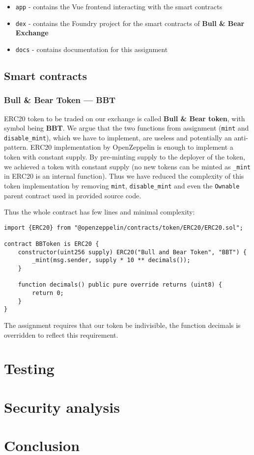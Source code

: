 \documentclass[11pt,a4paper]{article}
\begin{document}
\begin{itemize}
    \item \texttt{app} - contains the Vue frontend interacting with the smart contracts
    \item \texttt{dex} - contains the Foundry project for the smart contracts of \textbf{Bull \& Bear Exchange}
    \item \texttt{docs} - contains documentation for this assignment
\end{itemize}

\subsection*{Smart contracts}

\subsubsection*{Bull \& Bear Token --- BBT}

ERC20 token to be traded on our exchange is called \textbf{Bull \& Bear token},
with symbol being \textbf{BBT}. We argue that the two functions from assignment
(\texttt{mint} and \texttt{disable\_mint}), which we have to implement, are
useless and potentially an anti-pattern. ERC20 implementation by
OpenZeppelin is enough to implement a token with constant supply.
By pre-minting supply to the deployer of the token, we achieved a token
with constant supply (no new tokens can be minted as \texttt{\_mint} in ERC20
is an internal function\cite{openzeppelinERC20}). Thus we have reduced the
complexity of this token implementation by removing \texttt{mint}, \texttt{disable\_mint}
and even the \texttt{Ownable} parent contract used in provided source code.

Thus the whole contract has few lines and minimal complexity:

\begin{verbatim}
import {ERC20} from "@openzeppelin/contracts/token/ERC20/ERC20.sol";

contract BBToken is ERC20 {
    constructor(uint256 supply) ERC20("Bull and Bear Token", "BBT") {
        _mint(msg.sender, supply * 10 ** decimals());
    }

    function decimals() public pure override returns (uint8) {
        return 0;
    }
}
\end{verbatim}

The assignment requires that our token be indivisible, the function
decimals is overridden to reflect this requirement.

\section{Testing}

\section{Security analysis}

\section{Conclusion}



\end{document}
